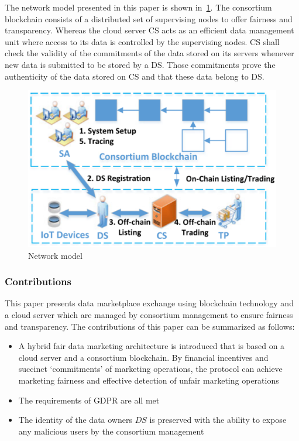 The network model presented in this paper is shown in~\cref{fig:22-network-model}.
The consortium blockchain consists of a distributed set of supervising nodes to offer fairness and transparency.
Whereas the cloud server CS acts as an efficient data management unit where access to its data is controlled by the supervising nodes.
CS shall check the validity of the commitments of the data stored on its servers whenever new data is submitted to be stored by a DS. Those commitments prove the authenticity of the data stored on CS and that these data belong to DS.

\begin{figure}
\centering
  \includegraphics[width=0.9\linewidth]{imgs/22-network-model.eps}
  \caption{Network model~\cite{liu2022blockchain}}
  \label{fig:22-network-model}
\end{figure}

\subsubsection{Contributions}

This paper presents data marketplace exchange using blockchain technology and a cloud server which are managed by consortium management to ensure fairness and transparency.
The contributions of this paper can be summarized as follows:

\begin{itemize}
    \item A hybrid fair data marketing architecture is introduced that is based on a cloud server and a consortium blockchain.
    By financial incentives and succinct ‘commitments’ of marketing operations, the protocol can achieve marketing fairness and effective detection of unfair marketing operations
    \item The requirements of GDPR are all met
    \item The identity of the data owners $DS$ is preserved with the ability to expose any malicious users by the consortium management 
\end{itemize}


